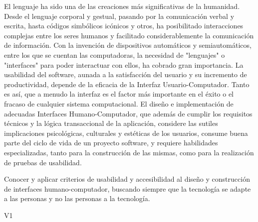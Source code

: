 \begin{syllabus}


\begin{justification}
	El lenguaje ha sido una de las creaciones más significativas de la humanidad. Desde el lenguaje corporal y gestual, pasando por la comunicación verbal y escrita, hasta códigos simbólicos icónicos y otros, ha posibilitado interacciones complejas entre los seres humanos y facilitado considerablemente la comunicación de información. Con la invención de dispositivos automáticos y semiautomáticos, entre los que se cuentan las computadoras, la necesidad de "lenguajes" o "interfaces" para poder interactuar con ellos, ha cobrado gran importancia.
	La usabilidad del software, aunada a la satisfacción del usuario y su incremento de productividad, depende de la eficacia de la Interfaz Usuario-Computador. Tanto es así­, que a menudo la interfaz es el factor más importante en el éxito o el fracaso de cualquier sistema computacional.
	El diseño e implementación de adecuadas Interfaces Humano-Computador, que además de cumplir los requisitos técnicos y la lógica transaccional de la aplicación, considere las sutiles implicaciones psicológicas, culturales y estéticas de los usuarios, consume buena parte del ciclo de vida de un proyecto software, y requiere habilidades especializadas, tanto para la construcción de las mismas, como para la realización de pruebas de usabilidad.
	\end{justification}
	
	\begin{goals}
	\item Conocer y aplicar criterios de usabilidad y accesibilidad al diseño y construcción de interfaces humano-computador, buscando siempre que la tecnología se adapte a las personas y no las personas a la tecnología.
	\end{goals}
	
	\begin{outcomes}{V1}
		\item {}
		\item {}
		\item {}
		\item {}
		\item {}
		\item {}
	\end{outcomes}
	

\end{syllabus}
